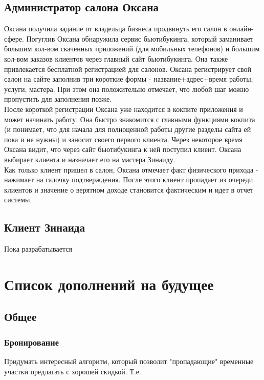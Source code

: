 \documentclass[DIV=calc, paper=a4, fontsize=11pt]{scrartcl} %
\begin{document}
\begin{framed}
    \subsection{Администратор салона Оксана}
    Оксана получила задание от владельца бизнеса продвинуть его салон в онлайн-сфере. Погуглив Оксана обнаружила сервис бьютибукинга, который заманивает большим кол-вом скаченных приложений (для мобильных телефонов) и большим кол-вом заказов клиентов через главный сайт бьютибукинга. Она также привлекается бесплатной регистрацией для салонов. Оксана регистрирует свой салон на сайте заполнив три короткие формы - название+адрес+время работы, услуги, мастера. При этом она положительно отмечает, что любой шаг можно пропустить для заполнения позже. 
    \\[0.5cm]
    После короткой регистрации Оксана уже находится в кокпите приложения и может начинать работу. Она быстро знакомится с главными функциями кокпита (и понимает, что для начала для полноценной работы другие разделы сайта ей пока и не нужны) и заносит своего первого клиента. Через некоторое время Оксана видит, что через сайт бьютибукинга к ней поступил клиент. Оксана выбирает клиента и назначает его на мастера Зинаиду. 
    \\[0.5cm]
    Как только клиент пришел в салон, Оксана отмечает факт физического прихода - нажимает на галочку подтверждения. После этого клиент пропадает из очереди клиентов и значение о верятном доходе становится фактическим и идет в отчет системы.
    
\end{framed}

\begin{framed}
    \subsection{Клиент Зинаида}
    Пока разрабатывается
\end{framed}


\section{Список дополнений на будущее}

\subsection{Общее}
\subsubsection{Бронирование}
Придумать интересный алгоритм, который позволит "пропадающие" временные участки предлагать с хорошей скидкой. Т.е. 
\end{document}
